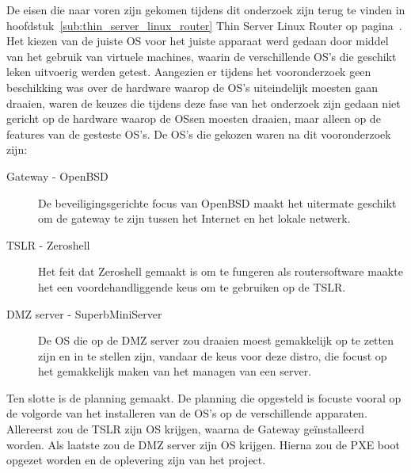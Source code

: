 \documentclass[12pt]{article}
\begin{document}
De eisen die naar voren zijn gekomen tijdens dit onderzoek zijn terug te vinden in hoofdstuk~\ref{sub:thin_server_linux_router} Thin Server Linux Router op pagina~\pageref{sub:thin_server_linux_router}.\\

Het kiezen van de juiste OS voor het juiste apparaat werd gedaan door middel van het gebruik van virtuele machines, waarin de verschillende OS's die geschikt leken uitvoerig werden getest. Aangezien er tijdens het vooronderzoek geen beschikking was over de hardware waarop de OS's uiteindelijk moesten gaan draaien, waren de keuzes die tijdens deze fase van het onderzoek zijn gedaan niet gericht op de hardware waarop de OSsen moesten draaien, maar alleen op de features van de gesteste OS's. De OS's die gekozen waren na dit vooronderzoek zijn:
\begin{description}
\item[Gateway - OpenBSD] De beveiligingsgerichte focus van OpenBSD maakt het uitermate geschikt om de gateway te zijn tussen het Internet en het lokale netwerk.
\item[TSLR - Zeroshell] Het feit dat Zeroshell gemaakt is om te fungeren als routersoftware maakte het een voordehandliggende keus om te gebruiken op de TSLR.
\item[DMZ server - SuperbMiniServer] De OS die op de DMZ server zou draaien moest gemakkelijk op te zetten zijn en in te stellen zijn, vandaar de keus voor deze distro, die focust op het gemakkelijk maken van het managen van een server.
\end{description}
Ten slotte is de planning gemaakt. De planning die opgesteld is focuste vooral op de volgorde van het installeren van de OS's op de verschillende apparaten. Allereerst zou de TSLR zijn OS krijgen, waarna de Gateway ge\"installeerd worden. Als laatste zou de DMZ server zijn OS krijgen. Hierna zou de PXE boot opgezet worden en de oplevering zijn van het project.
\end{document}
